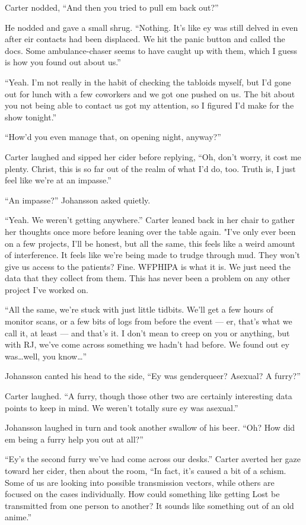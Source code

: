 Carter nodded, ``And then you tried to pull em back out?''

He nodded and gave a small shrug. ``Nothing. It's like ey was still delved in even after eir contacts had been displaced. We hit the panic button and called the docs. Some ambulance-chaser seems to have caught up with them, which I guess is how you found out about us.''

``Yeah. I'm not really in the habit of checking the tabloids myself, but I'd gone out for lunch with a few coworkers and we got one pushed on us. The bit about you not being able to contact us got my attention, so I figured I'd make for the show tonight.''

``How'd you even manage that, on opening night, anyway?''

Carter laughed and sipped her cider before replying, ``Oh, don't worry, it cost me plenty. Christ, this is so far out of the realm of what I'd do, too. Truth is, I just feel like we're at an impasse.''

``An impasse?'' Johansson asked quietly.

``Yeah. We weren't getting anywhere.'' Carter leaned back in her chair to gather her thoughts once more before leaning over the table again. "I've only ever been on a few projects, I'll be honest, but all the same, this feels like a weird amount of interference. It feels like we're being made to trudge through mud. They won't give us access to the patients? Fine. WFPHIPA is what it is. We just need the data that they collect from them. This has never been a problem on any other project I've worked on.

``All the same, we're stuck with just little tidbits. We'll get a few hours of monitor scans, or a few bits of logs from before the event --- er, that's what we call it, at least --- and that's it. I don't mean to creep on you or anything, but with RJ, we've come across something we hadn't had before. We found out ey was\ldots{}well, you know\ldots{}''

Johansson canted his head to the side, ``Ey was genderqueer? Asexual? A furry?''

Carter laughed. ``A furry, though those other two are certainly interesting data points to keep in mind. We weren't totally sure ey was asexual.''

Johansson laughed in turn and took another swallow of his beer. ``Oh? How did em being a furry help you out at all?''

``Ey's the second furry we've had come across our desks.'' Carter averted her gaze toward her cider, then about the room, ``In fact, it's caused a bit of a schism. Some of us are looking into possible transmission vectors, while others are focused on the cases individually. How could something like getting Lost be transmitted from one person to another? It sounds like something out of an old anime.''


